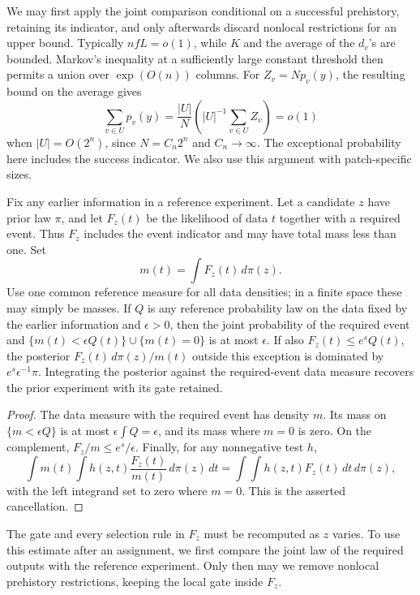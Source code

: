 We may first apply the joint comparison conditional on a successful
prehistory, retaining its indicator, and only afterwards discard
nonlocal restrictions for an upper bound. Typically \(nfL=o(1)\), while
\(K\) and the average of the \(d_v\)'s are bounded. Markov's inequality
at a sufficiently large constant threshold then permits a union over
\(\exp(O(n))\) columns. For \(Z_v=Np_v(y)\), the resulting bound on the
average gives
\[
 \sum_{v\in U}p_v(y)
   =\frac{|U|}{N}\left(|U|^{-1}\sum_{v\in U}Z_v\right)=o(1)
\]
when \(|U|=O(2^n)\), since \(N=C_n2^n\) and \(C_n\to\infty\).
The exceptional probability here includes the success indicator. We also
use this argument with patch-specific sizes.

\begin{lemma}\label{lem:gated-posterior}
Fix any earlier information in a reference experiment. Let a candidate
\(z\) have prior law \(\pi\), and let \(F_z(t)\) be the likelihood of data
\(t\) together with a required event. Thus \(F_z\) includes the event
indicator and may have total mass less than one. Set
\[
 m(t)=\int F_z(t)\,d\pi(z).
\]
Use one common reference measure for all data densities; in a finite
space these may simply be masses. If \(Q\) is any reference probability
law on the data fixed by the earlier information and \(\epsilon>0\), then the joint
probability of the required event and
\(\{m(t)<\epsilon Q(t)\}\cup\{m(t)=0\}\) is at most \(\epsilon\).
If also \(F_z(t)\le e^sQ(t)\), the posterior
\(F_z(t)\,d\pi(z)/m(t)\) outside this exception is dominated by
\(e^s\epsilon^{-1}\pi\). Integrating the posterior against the required-event
data measure recovers the prior experiment with its gate retained.
\end{lemma}

\begin{proof}
The data measure with the required event has density \(m\). Its mass on
\(\{m<\epsilon Q\}\) is at most \(\epsilon\int Q=\epsilon\), and its
mass where \(m=0\) is zero. On the complement,
\(F_z/m\le e^s/\epsilon\). Finally, for any nonnegative test \(h\),
\[
 \int m(t)\int h(z,t)\frac{F_z(t)}{m(t)}\,d\pi(z)\,dt
   =\int\!\int h(z,t)F_z(t)\,dt\,d\pi(z),
\]
with the left integrand set to zero where \(m=0\). This is the asserted
cancellation.
\end{proof}

The gate and every selection rule in \(F_z\) must be recomputed as \(z\)
varies. To use this estimate after an assignment, we first compare the
joint law of the required outputs with the reference experiment. Only
then may we remove nonlocal prehistory restrictions, keeping the local
gate inside \(F_z\).

